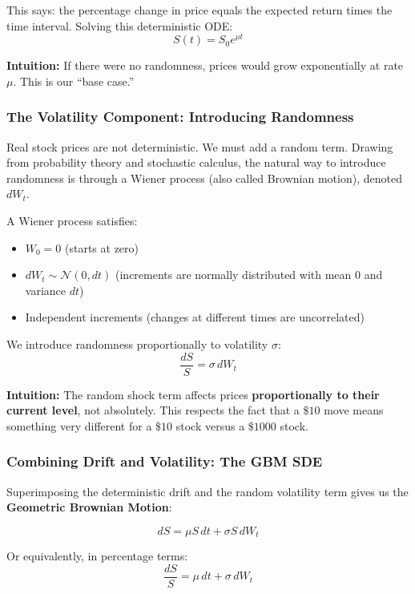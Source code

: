 \documentclass[12pt,a4paper]{article}
\begin{document}
This says: the percentage change in price equals the expected return times the time interval. Solving this deterministic ODE:
\begin{equation}
S(t) = S_0 e^{\mu t}
\end{equation}

\textbf{Intuition:} If there were no randomness, prices would grow exponentially at rate $\mu$. This is our ``base case.''

\subsubsection{The Volatility Component: Introducing Randomness}

Real stock prices are not deterministic. We must add a random term. Drawing from probability theory and stochastic calculus, the natural way to introduce randomness is through a Wiener process (also called Brownian motion), denoted $dW_t$.

A Wiener process satisfies:
\begin{itemize}
    \item $W_0 = 0$ (starts at zero)
    \item $dW_t \sim \mathcal{N}(0, dt)$ (increments are normally distributed with mean 0 and variance $dt$)
    \item Independent increments (changes at different times are uncorrelated)
\end{itemize}

We introduce randomness proportionally to volatility $\sigma$:
\begin{equation}
\frac{dS}{S} = \sigma \, dW_t
\end{equation}

\textbf{Intuition:} The random shock term affects prices \textbf{proportionally to their current level}, not absolutely. This respects the fact that a $\$10$ move means something very different for a $\$10$ stock versus a $\$1000$ stock.

\subsubsection{Combining Drift and Volatility: The GBM SDE}

Superimposing the deterministic drift and the random volatility term gives us the \textbf{Geometric Brownian Motion}:

\begin{tcolorbox}[colback=yellow!10, colframe=yellow!50, title=The Geometric Brownian Motion SDE]
\begin{equation}
\boxed{dS = \mu S \, dt + \sigma S \, dW_t}
\end{equation}

Or equivalently, in percentage terms:
\begin{equation}
\boxed{\frac{dS}{S} = \mu \, dt + \sigma \, dW_t}
\end{equation}
\end{tcolorbox}
\end{document}
